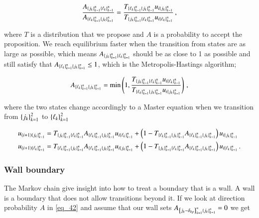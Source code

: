 \documentclass[11pt,english,a4paper]{article}
\begin{document}
\begin{flushleft}
\begin{align*}
\frac{A_{\left\lbrace{j_k}\right\rbrace_{k=1}^n \left\lbrace{\ell_k}\right\rbrace_{k=1}^n}}{A_{\left\lbrace{\ell_k}\right\rbrace_{k=1}^n \left\lbrace{j_k}\right\rbrace_{k=1}^n}} = \frac{T_{\left\lbrace{\ell_k}\right\rbrace_{k=1}^n \left\lbrace{j_k}\right\rbrace_{k=1}^n}u_{i\left\lbrace{j_k}\right\rbrace_{k=1}^n}}{T_{\left\lbrace{j_k}\right\rbrace_{k=1}^n \left\lbrace{\ell_k}\right\rbrace_{k=1}^n}u_{i\left\lbrace{\ell_k}\right\rbrace_{k=1}^n}} \,,
\end{align*}

where $T$ is a distribution that we propose and $A$ is a probability to accept the proposition. We reach equilibrium faster when the transition from states are as large as possible, which means $A_{\left\lbrace{j_k}\right\rbrace_{k=1}^n \left\lbrace{\ell_k}\right\rbrace_{k=1}^n}$ should be as close to 1 as possible and still satisfy that $A_{\left\lbrace{\ell_k}\right\rbrace_{k=1}^n \left\lbrace{j_k}\right\rbrace_{k=1}^n} \leq 1$, which is the Metropolis-Hastings algorithm;

\begin{align}
A_{\kr{\ell_k}_{k=1}^n\kr{j_k}_{k=1}^n} = \min\p{1,\frac{T_{\kr{j_k}_{k=1}^n\kr{\ell_k}_{k=1}^n}u_{i\kr{\ell_k}_{k=1}^n}}{T_{\kr{\ell_k}_{k=1}^n\kr{j_k}_{k=1}^n}u_{i\kr{j_k}_{k=1}^n}}}\,,
\label{eq_47}
\end{align}

where the two states change accordingly to a Master equation when we transition from $\left\lbrace{j_k}\right\rbrace_{k=1}^2$ to $\left\lbrace{\ell_k}\right\rbrace_{k=1}^2$ 

\begin{align}
u_{(i+1)\kr{j_k}_{k=1}^n} &=  T_{\kr{j_k}_{k=1}^n\kr{\ell_k}_{k=1}^n} A_{\kr{\ell_k}_{k=1}^n\kr{j_k}_{k=1}^n} u_{i\kr{\ell_k}_{k=1}^n} + \p{1-T_{\kr{\ell_k}_{k=1}^n\kr{j_k}_{k=1}^n} A_{\kr{\ell_k}_{k=1}^n\kr{j_k}_{k=1}^n}} u_{i\kr{j_k}_{k=1}^n}
\label{eq_48}\\
u_{(i+1)\kr{\ell_k}_{k=1}^n} &= T_{\kr{\ell_k}_{k=1}^n\kr{j_k}_{k=1}^n} A_{\kr{\ell_k}_{k=1}^n\kr{j_k}_{k=1}^n} u_{i\kr{j_k}_{k=1}^n} + \p{1-T_{\kr{j_k}_{k=1}^n\kr{\ell_k}_{k=1}^n} A_{\kr{\ell_k}_{k=1}^n\kr{j_k}_{k=1}^n}} u_{i\kr{\ell_k}_{k=1}^n} \,.
\label{eq_49}
\end{align} 

\subsubsection{Wall boundary}

The Markov chain give insight into how to treat a boundary that is a wall. A wall is a boundary that does not allow transitions beyond it. If we look at direction probability $A$ in \eqref{eq_42} and assume that our wall sets $A_{\left\lbrace{j_k-\delta_{kp}}\right\rbrace_{k=1}^n\left\lbrace{j_k}\right\rbrace_{k=1}^n}=0$ we get


\end{flushleft}
\end{document}
